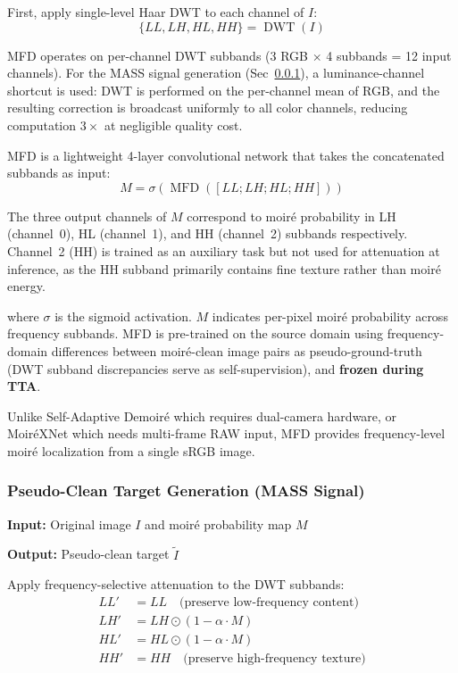 \documentclass[10pt,twocolumn,letterpaper]{article}
\begin{document}
First, apply single-level Haar DWT to each channel of $I$:
\begin{equation}
\{LL, LH, HL, HH\} = \operatorname{DWT}(I)
\end{equation}

MFD operates on per-channel DWT subbands (3 RGB $\times$ 4 subbands = 12 input channels). For the MASS signal generation (Sec~\ref{sec:mass}), a luminance-channel shortcut is used: DWT is performed on the per-channel mean of RGB, and the resulting correction is broadcast uniformly to all color channels, reducing computation $3\times$ at negligible quality cost.

MFD is a lightweight 4-layer convolutional network that takes the concatenated subbands as input:
\begin{equation}
M = \sigma(\operatorname{MFD}([LL; LH; HL; HH]))
\end{equation}

The three output channels of $M$ correspond to moir\'{e} probability in LH (channel~0), HL (channel~1), and HH (channel~2) subbands respectively. Channel~2 (HH) is trained as an auxiliary task but not used for attenuation at inference, as the HH subband primarily contains fine texture rather than moir\'{e} energy.

where $\sigma$ is the sigmoid activation. $M$ indicates per-pixel moir\'{e} probability across frequency subbands. MFD is pre-trained on the source domain using frequency-domain differences between moir\'{e}-clean image pairs as pseudo-ground-truth (DWT subband discrepancies serve as self-supervision), and \textbf{frozen during TTA}.

Unlike Self-Adaptive Demoir\'{e} \cite{liu2020wavelet} which requires dual-camera hardware, or Moir\'{e}XNet \cite{li2025moirexnet} which needs multi-frame RAW input, MFD provides frequency-level moir\'{e} localization from a single sRGB image.

\subsubsection{Pseudo-Clean Target Generation (MASS Signal)}
\label{sec:mass}

\textbf{Input:} Original image $I$ and moir\'{e} probability map $M$

\textbf{Output:} Pseudo-clean target $\tilde{I}$

Apply frequency-selective attenuation to the DWT subbands:
\begin{align}
LL' &= LL \quad \text{(preserve low-frequency content)} \\
LH' &= LH \odot (1 - \alpha \cdot M) \\
HL' &= HL \odot (1 - \alpha \cdot M) \\
HH' &= HH \quad \text{(preserve high-frequency texture)}
\end{align}
\end{document}
